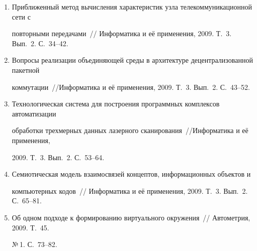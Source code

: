 \begin{enumerate}[1.]
Адаптация биометрической системы к искажающим факторам на примере 


дактилоскопической идентификации~// Информатика и её применения, 2009. Т.~3. 


Вып.~2. С.~25--33.





\item {}


Приближенный метод вычисления характеристик узла телекоммуникационной сети с 


повторными передачами~// Информатика и её применения, 2009. Т.~3. Вып.~2. С.~34--42.





\item {}


Вопросы реализации объединяющей среды в архитектуре децентрализованной пакетной 


коммутации~//\linebreak Информатика и её применения, 2009. Т.~3. Вып.~2. С.~43--52.





\item {}


Технологическая система для построения программных комплексов автоматизации 


обработки трехмерных данных лазерного сканирования~//\linebreak Информатика и её применения, 


2009. Т.~3. Вып.~2. С.~53--64.





\item {}


Семиотическая модель взаимосвязей концептов, информационных объектов и 


компьютерных кодов~// Информатика и её применения, 2009. Т.~3. Вып.~2. С.~65--81.





\item {}


Об одном подходе к формированию виртуального окружения~// Автометрия, 2009. Т.~45. 


№\,1. С.~73--82.






\end{enumerate}

